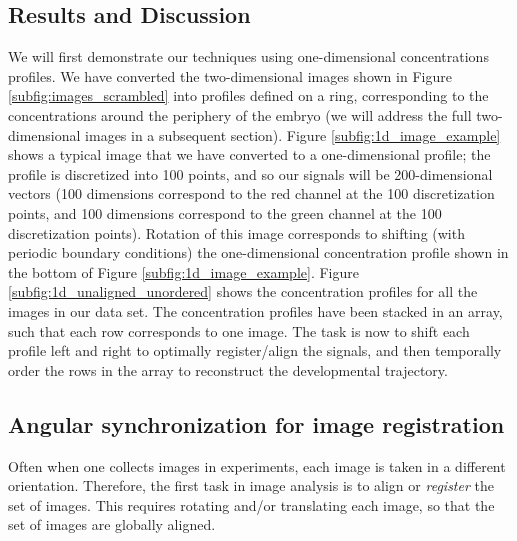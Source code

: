 \documentclass{pnastwo}
\begin{document}
\begin{article}
\section{Results and Discussion}

We will first demonstrate our techniques using one-dimensional concentrations profiles.
%
We have converted the two-dimensional images shown in Figure \ref{subfig:images_scrambled} into profiles defined on a ring, corresponding to the concentrations around the periphery of the embryo (we will address the full two-dimensional images in a subsequent section).
%
Figure \ref{subfig:1d_image_example} shows a typical image that we have converted to a one-dimensional profile; the profile is discretized into 100 points, and so our signals will be 200-dimensional vectors (100 dimensions correspond to the red channel at the 100 discretization points, and 100 dimensions correspond to the green channel at the 100 discretization points). 
%
Rotation of this image corresponds to shifting (with periodic boundary conditions) the one-dimensional concentration profile shown in the bottom of Figure \ref{subfig:1d_image_example}. 
%
Figure \ref{subfig:1d_unaligned_unordered} shows the concentration profiles for all the images in our data set. 
%
The concentration profiles have been stacked in an array, such that each row corresponds to one image.
%
The task is now to shift each profile left and right to optimally register/align the signals, and then temporally order the rows in the array to reconstruct the developmental trajectory.

\subsection{Angular synchronization for image registration}

Often when one collects images in experiments, each image is taken in a different orientation. 
%
Therefore, the first task in image analysis is to align or {\em register} the set of images. 
%
This requires rotating and/or translating each image, so that the set of images are globally aligned.


\end{article}
\end{document}
